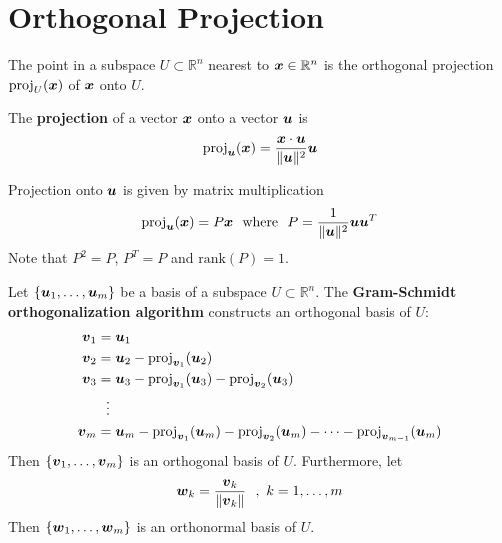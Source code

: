 \section{Orthogonal Projection}

\begin{bigidea}
The point in a subspace $U \subset \mathbb{R}^n$ nearest to $\boldsymbol{x} \in \mathbb{R}^n$ is the orthogonal projection $\mathrm{proj}_U (\boldsymbol{x})$ of $\boldsymbol{x}$ onto $U$.
\end{bigidea}

\begin{definition}
The {\bf projection} \cite[p.419]{KN} of a vector $\boldsymbol{x}$ onto a vector $\boldsymbol{u}$ is
$$
\mathrm{proj}_{\boldsymbol{u}}(\boldsymbol{x}) = \frac{\boldsymbol{x} \cdot \boldsymbol{u}}{\| \boldsymbol{u} \|^2} \boldsymbol{u}
$$
\end{definition}

\begin{note}
Projection onto $\boldsymbol{u}$ is given by matrix multiplication
$$
\mathrm{proj}_{\boldsymbol{u}}(\boldsymbol{x}) = P \boldsymbol{x}
\ \ \text{where} \ \
P = \frac{1}{\| \boldsymbol{u} \|^2} \boldsymbol{u} \boldsymbol{u}^T
$$
Note that $P^2 = P$, $P^T = P$ and $\mathrm{rank}(P) = 1$.
\end{note}


\begin{theorem}
Let $\{ \boldsymbol{u}_1 , \dots , \boldsymbol{u}_m \}$ be a basis of a subspace $U \subset \mathbb{R}^n$. The {\bf Gram-Schmidt orthogonalization algorithm} \cite[p.417]{KN} constructs an orthogonal basis of $U$:
\begin{align*}
\boldsymbol{v}_1 &= \boldsymbol{u}_1 \\
\boldsymbol{v}_2 &= \boldsymbol{u}_2 - \mathrm{proj}_{\boldsymbol{v}_1}(\boldsymbol{u}_2) \\
\boldsymbol{v}_3 &= \boldsymbol{u}_3 - \mathrm{proj}_{\boldsymbol{v}_1}(\boldsymbol{u}_3) - \mathrm{proj}_{\boldsymbol{v}_2}(\boldsymbol{u}_3) \\
& \ \ \vdots \\
\boldsymbol{v}_m &= \boldsymbol{u}_m - \mathrm{proj}_{\boldsymbol{v}_1}(\boldsymbol{u}_m) - \mathrm{proj}_{\boldsymbol{v}_2}(\boldsymbol{u}_m) - \cdots - \mathrm{proj}_{\boldsymbol{v}_{m-1}}(\boldsymbol{u}_m)
\end{align*}
Then $\{ \boldsymbol{v}_1 , \dots , \boldsymbol{v}_m \}$ is an orthogonal basis of $U$. Furthermore, let
$$
\boldsymbol{w}_k = \frac{\boldsymbol{v}_k}{\| \boldsymbol{v}_k \|} \ \ , \ k=1,\dots,m
$$
Then $\{ \boldsymbol{w}_1 , \dots , \boldsymbol{w}_m \}$ is an orthonormal basis of $U$. 
\end{theorem}

